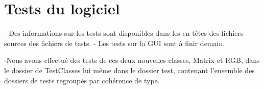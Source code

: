 \section{Tests du logiciel}

  - Des informations sur les tests sont disponibles dans les en-têtes des
  fichiers sources des fichiers de tests.
  - Les tests sur la GUI sont à finir demain.
  
 -Nous avons effectué des tests de ces deux nouvelles classes, Matrix et RGB,
  dans le dossier de TestClasses lui même dans le dossier test, contenant
  l'ensemble des dossiers de tests regroupés par cohérence de type.

